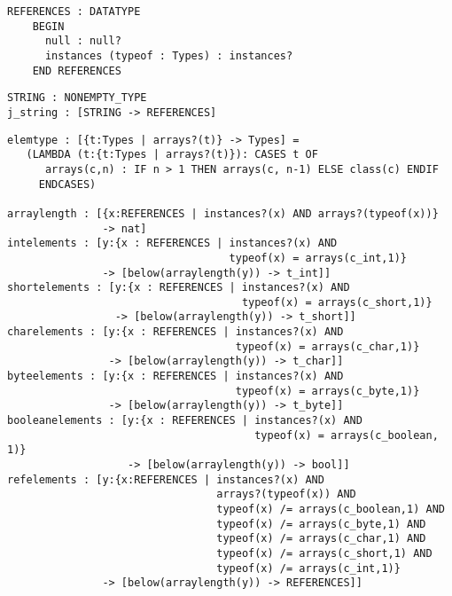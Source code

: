 \begin{verbatim}
REFERENCES : DATATYPE
    BEGIN
      null : null?
      instances (typeof : Types) : instances?
    END REFERENCES
\end{verbatim}
\begin{verbatim}
STRING : NONEMPTY_TYPE
j_string : [STRING -> REFERENCES]
\end{verbatim}
\begin{verbatim}
elemtype : [{t:Types | arrays?(t)} -> Types] =
   (LAMBDA (t:{t:Types | arrays?(t)}): CASES t OF
      arrays(c,n) : IF n > 1 THEN arrays(c, n-1) ELSE class(c) ENDIF
     ENDCASES)

arraylength : [{x:REFERENCES | instances?(x) AND arrays?(typeof(x))} 
               -> nat]
intelements : [y:{x : REFERENCES | instances?(x) AND 
                                   typeof(x) = arrays(c_int,1)} 
               -> [below(arraylength(y)) -> t_int]]
shortelements : [y:{x : REFERENCES | instances?(x) AND 
                                     typeof(x) = arrays(c_short,1)} 
                 -> [below(arraylength(y)) -> t_short]]
charelements : [y:{x : REFERENCES | instances?(x) AND 
                                    typeof(x) = arrays(c_char,1)} 
                -> [below(arraylength(y)) -> t_char]]
byteelements : [y:{x : REFERENCES | instances?(x) AND 
                                    typeof(x) = arrays(c_byte,1)} 
                -> [below(arraylength(y)) -> t_byte]]
booleanelements : [y:{x : REFERENCES | instances?(x) AND 
                                       typeof(x) = arrays(c_boolean, 1)} 
                   -> [below(arraylength(y)) -> bool]]
refelements : [y:{x:REFERENCES | instances?(x) AND 
                                 arrays?(typeof(x)) AND 
                                 typeof(x) /= arrays(c_boolean,1) AND 
                                 typeof(x) /= arrays(c_byte,1) AND 
                                 typeof(x) /= arrays(c_char,1) AND 
                                 typeof(x) /= arrays(c_short,1) AND 
                                 typeof(x) /= arrays(c_int,1)} 
               -> [below(arraylength(y)) -> REFERENCES]]
\end{verbatim}
